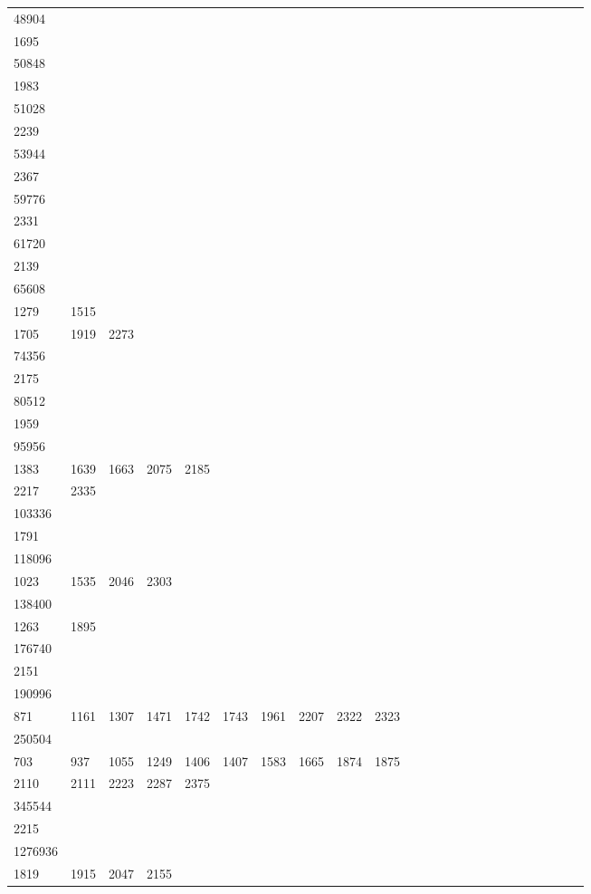 \begin{longtable}{*{24}{l}}
48904&&&&&&&&&\\
1695& \\
50848&&&&&&&&&\\
1983& \\
51028&&&&&&&&&\\
2239& \\
53944&&&&&&&&&\\
2367& \\
59776&&&&&&&&&\\
2331& \\
61720&&&&&&&&&\\
2139& \\
65608&&&&&&&&&\\
1279& 1515\\
1705& 1919& 2273& \\
74356&&&&&&&&&\\
2175& \\
80512&&&&&&&&&\\
1959& \\
95956&&&&&&&&&\\
1383& 1639& 1663& 2075& 2185\\
2217& 2335& \\
103336&&&&&&&&&\\
1791& \\
118096&&&&&&&&&\\
1023& 1535& 2046& 2303& \\
138400&&&&&&&&&\\
1263& 1895& \\
176740&&&&&&&&&\\
2151\\
190996&&&&&&&&&\\
871& 1161& 1307& 1471& 1742& 1743& 1961& 2207& 2322& 2323\\
250504&&&&&&&&&\\
703& 937& 1055& 1249& 1406& 1407& 1583& 1665& 1874& 1875\\
2110& 2111& 2223& 2287& 2375& \\
345544&&&&&&&&&\\
2215& \\
1276936&&&&&&&&&\\
1819& 1915& 2047& 2155\\
\bottomrule\end{longtable}
